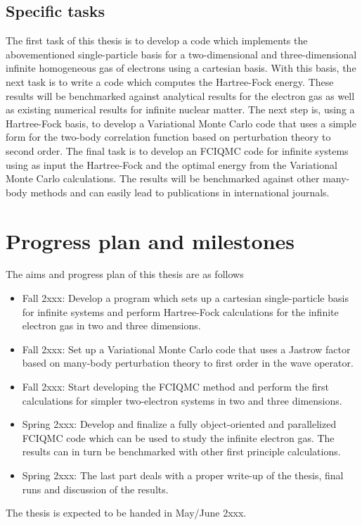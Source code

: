 \documentclass[%
oneside,                 %
final,                   %
10pt]{article}
\begin{document}
\subsection*{Specific tasks}

The first task of this thesis is to develop a code which implements the abovementioned single-particle basis for a two-dimensional and three-dimensional infinite homogeneous gas of electrons  using a cartesian basis. With this basis, the next task is to write a code which computes the Hartree-Fock energy. These results will be benchmarked against analytical results for the electron gas as well as existing numerical results for infinite nuclear matter. 
The next step is, using a Hartree-Fock basis, to develop a Variational Monte Carlo code that uses a simple form for the two-body correlation function based on perturbation theory to second order. 
The final task is to develop an FCIQMC code for infinite systems using as input the Hartree-Fock and the optimal energy from the Variational Monte Carlo calculations. The results will be benchmarked against other many-body methods and can easily lead to publications in international journals. 





\section*{Progress plan and milestones}

The aims and progress plan of this thesis are as follows

\begin{itemize}
  \item Fall 2xxx: Develop a program which sets up a cartesian single-particle basis for infinite systems and perform Hartree-Fock calculations for the infinite electron gas in two and three dimensions.

  \item Fall 2xxx:  Set up a Variational Monte Carlo code that uses a Jastrow factor based on many-body perturbation theory to first order in the wave operator.

  \item Fall 2xxx:  Start developing the FCIQMC method and perform the first calculations for simpler two-electron systems in two and three dimensions.

  \item Spring 2xxx: Develop and finalize a fully object-oriented and parallelized FCIQMC code which can be used to study the infinite electron gas. The results can in turn be benchmarked with other first principle calculations.

  \item Spring 2xxx: The last part deals with a proper write-up of the thesis, final runs and discussion of the results.
\end{itemize}

\noindent
The thesis is expected to be handed in May/June 2xxx.













\end{document}
